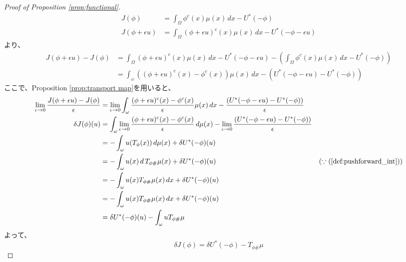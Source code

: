 \documentclass{jsarticle}
\theoremstyle{definition}
\begin{document}
\begin{proof}[Proof of Proposition \ref{prop:functional}]
    \begin{align*}
        J(\phi) &= \int_{\Omega} \phi^c(x) \mu(x) \,dx - U^*(- \phi)\\
        J(\phi + \epsilon u) &= \int_{\Omega} (\phi + \epsilon u)^c(x)\mu(x) \,dx - U^*(- \phi - \epsilon u)
    \end{align*}
    より、
    \begin{align*}
        J(\phi + \epsilon u) - J(\phi)  &= \int_{\Omega} (\phi + \epsilon u)^c(x)\mu(x) \,dx - U^*(- \phi - \epsilon u) - \left( \int_{\Omega} \phi^c(x) \mu(x) \,dx - U^*(- \phi) \right)\\
                                        &= \int_\omega \left((\phi + \epsilon u)^c(x) - \phi^c(x) \right) \mu(x) \,dx - \left(U^*(- \phi - \epsilon u) - U^*(- \phi) \right)
    \end{align*}
    ここで、Proposition \ref{prop:transport map}を用いると、
    \begin{align*}
        \lim_{\epsilon \to 0} \frac{J(\phi + \epsilon u) - J(\phi)}{\epsilon} &= \lim_{\epsilon \to 0} \int_\omega \frac{(\phi + \epsilon u)^c(x) - \phi^c(x)}{\epsilon}\mu(x) \,dx - \frac{\left(U^*(- \phi - \epsilon u) - U^*(- \phi) \right)}{\epsilon}\\
                                                            \delta J(\phi)(u)  &= \int_\omega \lim_{\epsilon \to 0} \frac{(\phi + \epsilon u)^c(x) - \phi^c(x)}{\epsilon} \, d\mu(x) - \lim_{\epsilon \to 0}\frac{\left(U^*(- \phi - \epsilon u) - U^*(- \phi) \right)}{\epsilon}\\
                                                                              &= - \int_\omega u(T_\phi(x)) \, d\mu(x) + \delta U^*(- \phi)(u)\\
                                                                              &=  - \int_\omega u(x) \, d\, T_{\phi \#} \mu(x) + \delta U^*(- \phi)(u) & (\because (\ref{def:pushforward_int}))\\
                                                                              &=  - \int_\omega u(x) T_{\phi \#} \mu(x) \, dx + \delta U^*(- \phi)(u)\\
                                                                              &= - \int_\omega u(x) T_{\phi \#} \mu(x)\, dx + \delta U^*(- \phi)(u)\\
                                                                              &= \delta U^*(- \phi)(u) - \int_\omega u T_{\phi \#} \mu
    \end{align*}
    よって、
    \begin{equation*}
        \delta J(\phi) = \delta U^*(- \phi) - T_{\phi \#} \mu
    \end{equation*}
    

\end{proof}
\end{document}
